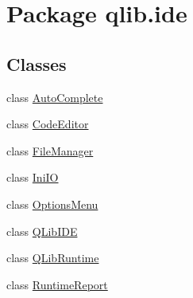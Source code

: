 \hypertarget{namespaceqlib_1_1ide}{}\section{Package qlib.\+ide}
\label{namespaceqlib_1_1ide}
\subsection*{Classes}
\begin{DoxyCompactItemize}
\item 
class \hyperlink{classqlib_1_1ide_1_1AutoComplete}{Auto\+Complete}
\item 
class \hyperlink{classqlib_1_1ide_1_1CodeEditor}{Code\+Editor}
\item 
class \hyperlink{classqlib_1_1ide_1_1FileManager}{File\+Manager}
\item 
class \hyperlink{classqlib_1_1ide_1_1IniIO}{Ini\+IO}
\item 
class \hyperlink{classqlib_1_1ide_1_1OptionsMenu}{Options\+Menu}
\item 
class \hyperlink{classqlib_1_1ide_1_1QLibIDE}{Q\+Lib\+I\+DE}
\item 
class \hyperlink{classqlib_1_1ide_1_1QLibRuntime}{Q\+Lib\+Runtime}
\item 
class \hyperlink{classqlib_1_1ide_1_1RuntimeReport}{Runtime\+Report}
\end{DoxyCompactItemize}
